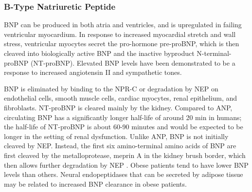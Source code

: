 \documentclass[14pt,a4paper,onecolumn]{extarticle}
\begin{document}










\subsubsection{B-Type Natriuretic Peptide}



BNP can be produced in both atria and ventricles, and is upregulated in failing ventricular myocardium. In response to increased myocardial stretch and wall stress, ventricular myocytes secret the pro-hormone pre-proBNP, which is then cleaved into biologically active BNP and the inactive byproduct N-terminal-proBNP (NT-proBNP). Elevated BNP levels have been demonstrated to be a response to increased angiotensin II and sympathetic tones. \citep{Iwanaga2006} %





BNP is eliminated by binding to the NPR-C or degradation by NEP on endothelial cells, smooth muscle cells, cardiac myocytes, renal epithelium, and fibroblasts. NT-proBNP is cleared mainly by the kidney. Compared to ANP, circulating BNP has a significantly longer half-life of around 20 min in humans; the half-life of NT-proBNP is about 60-90 minutes and would be expected to be longer in the setting of renal dysfunction. Unlike ANP, BNP is not initially cleaved by NEP. Instead, the first six amino-terminal amino acids of BNP are first cleaved by the metalloprotease, meprin A in the kidney brush border, which then allows further degradation by NEP \citep{Pankow2007}. Obese patients tend to have lower BNP levels than others. Neural endopeptidases that can be secreted by adipose tissue may be related to increased BNP clearance in obese patients.\citep{Yang2004} %
\end{document}
